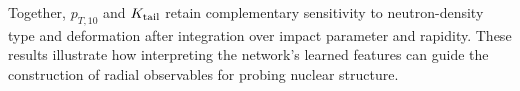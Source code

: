 
Together, $p_{T,10}$ and $K_{\rm tail}$ retain complementary sensitivity to neutron-density type and deformation after integration over impact parameter and rapidity. These results illustrate how interpreting the network's learned features can guide the construction of radial observables for probing nuclear structure.
